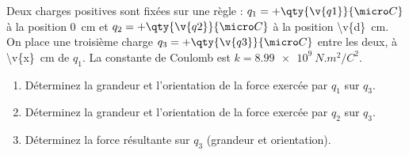 Deux charges positives sont fixées sur une règle : $q_1 = +\qty{\v{q1}}{\micro C}$ à la position \qty{0}{cm} et $q_2 = +\qty{\v{q2}}{\micro C}$ à la position \qty{\v{d}}{cm}. On place une troisième charge $q_3 = +\qty{\v{q3}}{\micro C}$ entre les deux, à \qty{\v{x}}{cm} de $q_1$. La constante de Coulomb est $k = \qty{8.99e9}{N.m^2/C^2}$.

\begin{enumerate}[label=\alph*)]
    \item Déterminez la grandeur et l'orientation de la force exercée par $q_1$ sur $q_3$.
    \item Déterminez la grandeur et l'orientation de la force exercée par $q_2$ sur $q_3$.
    \item Déterminez la force résultante sur $q_3$ (grandeur et orientation).
\end{enumerate}

